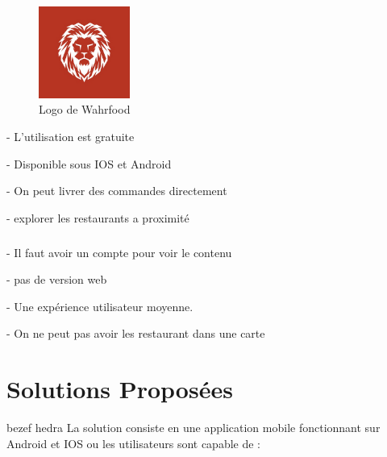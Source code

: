 \subparagraph*{}
\begin{figure}
	\vspace{-15pt}
	\begin{flushright}
\includegraphics[width=3cm]{images/Chapitre1/wahrfood.jpg}
	\end{flushright}
    \vspace{-20pt}
    \caption{{\footnotesize Logo de Wahrfood}}
\end{figure}
\begin{list}{•}{\textbf{Avantages}}
	\item - L'utilisation est gratuite 
	\item - Disponible sous IOS et Android 
	\item - On peut livrer des commandes directement 
	\item - explorer les restaurants a proximité
	
\end{list}

\subparagraph*{}
\begin{list}{•}{\textbf{Inconvénients}}
	\item - Il faut avoir un compte pour voir le contenu 
	\item - pas de version web 
	\item - Une expérience utilisateur moyenne.
	\item - On ne peut pas avoir les restaurant dans une carte
   
\end{list}
\newpage
\section{Solutions Proposées}
bezef hedra
\newline
La solution consiste en une application mobile 
fonctionnant sur Android et IOS ou les utilisateurs
sont capable de : 
\begin{list}{•}{}
\item 
\end{list}
